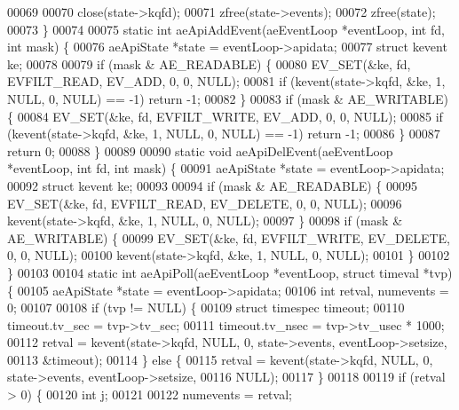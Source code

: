 \begin{DoxyCode}
00069 
00070     close(state->kqfd);
00071     zfree(state->events);
00072     zfree(state);
00073 \}
00074 
00075 \textcolor{keyword}{static} \textcolor{keywordtype}{int} aeApiAddEvent(aeEventLoop *eventLoop, \textcolor{keywordtype}{int} fd, \textcolor{keywordtype}{int} mask) \{
00076     aeApiState *state = eventLoop->apidata;
00077     \textcolor{keyword}{struct} kevent ke;
00078 
00079     \textcolor{keywordflow}{if} (mask & AE\_READABLE) \{
00080         EV\_SET(&ke, fd, EVFILT\_READ, EV\_ADD, 0, 0, NULL);
00081         \textcolor{keywordflow}{if} (kevent(state->kqfd, &ke, 1, NULL, 0, NULL) == -1) \textcolor{keywordflow}{return} -1;
00082     \}
00083     \textcolor{keywordflow}{if} (mask & AE\_WRITABLE) \{
00084         EV\_SET(&ke, fd, EVFILT\_WRITE, EV\_ADD, 0, 0, NULL);
00085         \textcolor{keywordflow}{if} (kevent(state->kqfd, &ke, 1, NULL, 0, NULL) == -1) \textcolor{keywordflow}{return} -1;
00086     \}
00087     \textcolor{keywordflow}{return} 0;
00088 \}
00089 
00090 \textcolor{keyword}{static} \textcolor{keywordtype}{void} aeApiDelEvent(aeEventLoop *eventLoop, \textcolor{keywordtype}{int} fd, \textcolor{keywordtype}{int} mask) \{
00091     aeApiState *state = eventLoop->apidata;
00092     \textcolor{keyword}{struct} kevent ke;
00093 
00094     \textcolor{keywordflow}{if} (mask & AE\_READABLE) \{
00095         EV\_SET(&ke, fd, EVFILT\_READ, EV\_DELETE, 0, 0, NULL);
00096         kevent(state->kqfd, &ke, 1, NULL, 0, NULL);
00097     \}
00098     \textcolor{keywordflow}{if} (mask & AE\_WRITABLE) \{
00099         EV\_SET(&ke, fd, EVFILT\_WRITE, EV\_DELETE, 0, 0, NULL);
00100         kevent(state->kqfd, &ke, 1, NULL, 0, NULL);
00101     \}
00102 \}
00103 
00104 \textcolor{keyword}{static} \textcolor{keywordtype}{int} aeApiPoll(aeEventLoop *eventLoop, \textcolor{keyword}{struct} timeval *tvp) \{
00105     aeApiState *state = eventLoop->apidata;
00106     \textcolor{keywordtype}{int} retval, numevents = 0;
00107 
00108     \textcolor{keywordflow}{if} (tvp != NULL) \{
00109         \textcolor{keyword}{struct} timespec timeout;
00110         timeout.tv\_sec = tvp->tv\_sec;
00111         timeout.tv\_nsec = tvp->tv\_usec * 1000;
00112         retval = kevent(state->kqfd, NULL, 0, state->events, eventLoop->setsize,
00113                         &timeout);
00114     \} \textcolor{keywordflow}{else} \{
00115         retval = kevent(state->kqfd, NULL, 0, state->events, eventLoop->setsize,
00116                         NULL);
00117     \}
00118 
00119     \textcolor{keywordflow}{if} (retval > 0) \{
00120         \textcolor{keywordtype}{int} j;
00121 
00122         numevents = retval;

\end{DoxyCode}
